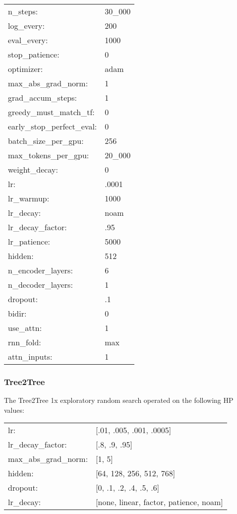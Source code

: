 \begin{tabular}{ll}
    n\_steps: & 30\_000 \\  
    log\_every: & 200 \\
    eval\_every: & 1000 \\
    stop\_patience: & 0 \\
    optimizer: & adam \\    
    max\_abs\_grad\_norm: & 1 \\
    grad\_accum\_steps: & 1 \\
    greedy\_must\_match\_tf: & 0 \\
    early\_stop\_perfect\_eval: & 0 \\
    batch\_size\_per\_gpu: & 256 \\
    max\_tokens\_per\_gpu: & 20\_000  \\  
    weight\_decay: & 0 \\
    lr: & .0001 \\
    lr\_warmup: & 1000 \\
    lr\_decay: & noam \\
    lr\_decay\_factor: & .95 \\
    lr\_patience: & 5000 \\
    hidden: & 512 \\
    n\_encoder\_layers: & 6 \\
    n\_decoder\_layers: & 1 \\
    dropout: & .1 \\
    bidir: & 0 \\
    use\_attn: & 1 \\
    rnn\_fold: & max \\
    attn\_inputs: & 1 \\  
\end{tabular}

\subsubsection{Tree2Tree}

The Tree2Tree 1x exploratory random search operated on the following HP values: 

\begin{tabular}{ll}
lr: & [.01, .005, .001, .0005] \\
lr\_decay\_factor: & [.8, .9, .95] \\
max\_abs\_grad\_norm: & [1, 5] \\
hidden: & [64, 128, 256, 512, 768] \\
dropout: & [0, .1, .2, .4, .5, .6] \\
lr\_decay: & [none, linear, factor, patience, noam] \\
\end{tabular}

